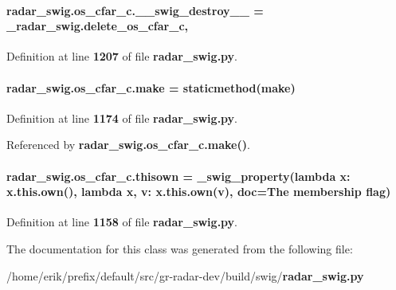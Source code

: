 \paragraph[{\+\_\+\+\_\+swig\+\_\+destroy\+\_\+\+\_\+}]{\setlength{\rightskip}{0pt plus 5cm}radar\+\_\+swig.\+os\+\_\+cfar\+\_\+c.\+\_\+\+\_\+swig\+\_\+destroy\+\_\+\+\_\+ = \+\_\+radar\+\_\+swig.\+delete\+\_\+os\+\_\+cfar\+\_\+c\hspace{0.3cm}{\ttfamily [static]}, {\ttfamily [private]}}\label{classradar__swig_1_1os__cfar__c_a53b7b35d4661efab85adcfa512e1e953}


Definition at line {\bf 1207} of file {\bf radar\+\_\+swig.\+py}.

\paragraph[{make}]{\setlength{\rightskip}{0pt plus 5cm}radar\+\_\+swig.\+os\+\_\+cfar\+\_\+c.\+make = staticmethod(make)\hspace{0.3cm}{\ttfamily [static]}}\label{classradar__swig_1_1os__cfar__c_a225f5441f1af3fede87a64f0b72d5d1f}


Definition at line {\bf 1174} of file {\bf radar\+\_\+swig.\+py}.



Referenced by {\bf radar\+\_\+swig.\+os\+\_\+cfar\+\_\+c.\+make()}.

\paragraph[{thisown}]{\setlength{\rightskip}{0pt plus 5cm}radar\+\_\+swig.\+os\+\_\+cfar\+\_\+c.\+thisown = {\bf \+\_\+swig\+\_\+property}(lambda x\+: x.\+this.\+own(), lambda {\bf x}, v\+: x.\+this.\+own(v), doc=\textquotesingle{}The membership flag\textquotesingle{})\hspace{0.3cm}{\ttfamily [static]}}\label{classradar__swig_1_1os__cfar__c_adb61bdf6a269399a1cd342601406f803}


Definition at line {\bf 1158} of file {\bf radar\+\_\+swig.\+py}.



The documentation for this class was generated from the following file\+:\begin{DoxyCompactItemize}
\item 
/home/erik/prefix/default/src/gr-\/radar-\/dev/build/swig/{\bf radar\+\_\+swig.\+py}\end{DoxyCompactItemize}

